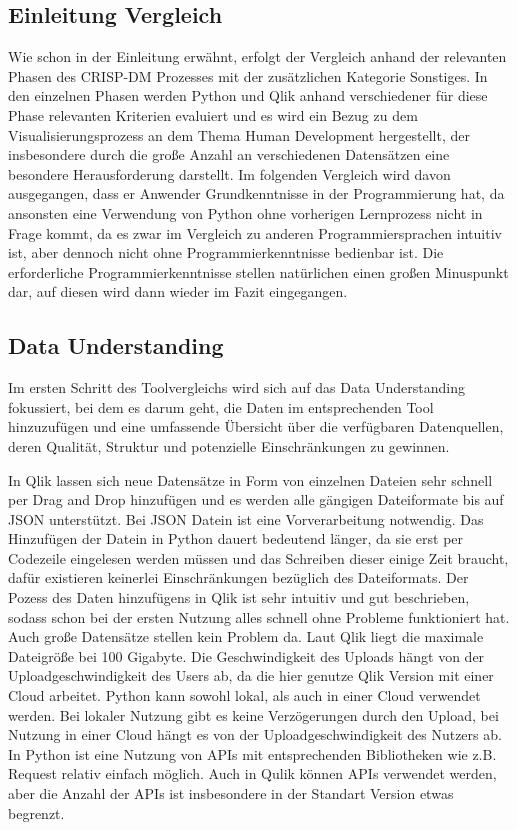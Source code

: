 \documentclass[12pt]{article}
\begin{document}
	\subsection{Einleitung Vergleich}
	Wie schon in der Einleitung erwähnt, erfolgt der Vergleich anhand der relevanten Phasen des CRISP-DM Prozesses mit der zusätzlichen Kategorie Sonstiges. In den einzelnen Phasen werden Python und Qlik anhand verschiedener für diese Phase relevanten Kriterien evaluiert und es wird ein Bezug zu dem Visualisierungsprozess an dem Thema Human Development hergestellt, der insbesondere durch die große Anzahl an verschiedenen Datensätzen eine besondere Herausforderung darstellt. Im folgenden Vergleich wird davon ausgegangen, dass er Anwender Grundkenntnisse in der Programmierung hat, da ansonsten eine Verwendung von Python ohne vorherigen Lernprozess nicht in Frage kommt, da es zwar im Vergleich zu anderen Programmiersprachen intuitiv ist, aber dennoch nicht ohne Programmierkenntnisse bedienbar ist. Die erforderliche Programmierkenntnisse stellen natürlichen einen großen Minuspunkt dar, auf diesen wird dann wieder im Fazit eingegangen.
	
	\subsection{Data Understanding}
	Im ersten Schritt des Toolvergleichs wird sich auf das Data Understanding fokussiert, bei dem es darum geht, die Daten im entsprechenden Tool hinzuzufügen und eine umfassende Übersicht über die verfügbaren Datenquellen, deren Qualität, Struktur und potenzielle Einschränkungen zu gewinnen.

	In Qlik lassen sich neue Datensätze in Form von einzelnen Dateien sehr schnell per Drag and Drop hinzufügen und es werden alle gängigen Dateiformate bis auf JSON unterstützt. Bei JSON Datein ist eine Vorverarbeitung notwendig. Das Hinzufügen der Datein in Python dauert bedeutend länger, da sie erst per Codezeile eingelesen werden müssen und das Schreiben dieser einige Zeit braucht, dafür existieren keinerlei Einschränkungen bezüglich des Dateiformats.
	Der Pozess des Daten hinzufügens in Qlik ist sehr intuitiv und gut beschrieben, sodass schon bei der ersten Nutzung alles schnell ohne Probleme funktioniert hat. Auch große Datensätze stellen kein Problem da. Laut Qlik liegt die maximale Dateigröße bei 100 Gigabyte. Die Geschwindigkeit des Uploads hängt von der Uploadgeschwindigkeit des Users ab, da die hier genutze Qlik Version mit einer Cloud arbeitet. Python kann sowohl lokal, als auch in einer Cloud verwendet werden. Bei lokaler Nutzung gibt es keine Verzögerungen durch den Upload, bei Nutzung in einer Cloud hängt es von der Uploadgeschwindigkeit des Nutzers ab.
	In Python ist eine Nutzung von APIs mit entsprechenden Bibliotheken wie z.B. Request relativ einfach möglich.
	Auch in Qulik können APIs verwendet werden, aber die Anzahl der APIs ist insbesondere in der Standart Version etwas begrenzt.
	
\end{document}
